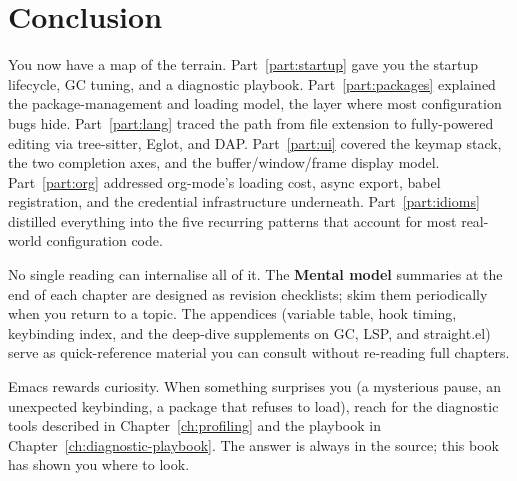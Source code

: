 \chapter*{Conclusion}
\label{ch:conclusion}

You now have a map of the terrain.  Part~\ref{part:startup} gave you
the startup lifecycle, GC tuning, and a diagnostic playbook.
Part~\ref{part:packages} explained the package-management and loading
model, the layer where most configuration bugs hide.
Part~\ref{part:lang} traced the path from file extension to
fully-powered editing via tree-sitter, Eglot, and DAP.
Part~\ref{part:ui} covered the keymap stack, the two completion axes,
and the buffer/window/frame display model.
Part~\ref{part:org} addressed org-mode's loading cost, async export,
babel registration, and the credential infrastructure underneath.
Part~\ref{part:idioms} distilled everything into the five recurring
patterns that account for most real-world configuration code.

No single reading can internalise all of it.  The \textbf{Mental
model} summaries at the end of each chapter are designed as revision
checklists; skim them periodically when you return to a topic.  The
appendices (variable table, hook timing, keybinding index, and the
deep-dive supplements on GC, LSP, and straight.el) serve as
quick-reference material you can consult without re-reading full
chapters.

Emacs rewards curiosity.  When something surprises you (a
mysterious pause, an unexpected keybinding, a package that refuses to
load), reach for the diagnostic tools described in
Chapter~\ref{ch:profiling} and the playbook in
Chapter~\ref{ch:diagnostic-playbook}.  The answer is always in the
source; this book has shown you where to look.
